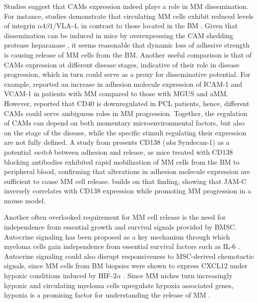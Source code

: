 Studies suggest that \acp{CAM} expression indeed plays a role in \ac{MM}
dissemination. For instance, studies demonstrate that circulating \ac{MM} cells
exhibit reduced levels of integrin $\alpha4\beta1$/VLA-4, in contrast to those located
in the \ac{BM} \cite{paivaDetailedCharacterizationMultiple2013,
    paivaCompetitionClonalPlasma2011}. Given that dissemination can be induced in
mice by overexpressing the \ac{CAM} shedding protease heparanase
\cite{yangHeparanasePromotesSpontaneous2005}, it seems reasonable that dynamic
loss of adhesive strength is causing release of \ac{MM} cells from the \ac{BM}.
Another useful comparison is that of \acp{CAM} expression at different disease
stages, indicative of their role in disease progression, which in turn could
serve as a proxy for disseminative potential. For example,
\citet{terposIncreasedCirculatingVCAM12016}
reported an increase in adhesion molecule expression of ICAM-1 and VCAM-1 in
patients with \ac{MM} compared to those with \ac{MGUS} and \ac{aMM}. However,
\citet{perez-andresClonalPlasmaCells2005} reported that CD40 is downregulated in
\ac{PCL} patients, hence, different \acp{CAM} could serve ambiguous roles in
\ac{MM} progression. Together, the regulation of \acp{CAM} can depend on both
momentary microenvironmental factors, but also on the stage of the disease,
while the specific stimuli regulating their expression are not fully defined. A
study from \citet{akhmetzyanovaDynamicCD138Surface2020} presents CD138
(\textit{aka} Syndecan-1) as a potential \textit{switch} between adhesion and
release, as mice treated with CD138 blocking antibodies exhibited
rapid mobilization of \ac{MM} cells from the \ac{BM} to peripheral blood,
confirming that alterations in adhesion molecule expression are sufficient to
cause \ac{MM} cell release. \citet{brandlJunctionalAdhesionMolecule2022}
builds on that finding, showing that JAM-C inversely correlates with CD138
expression while promoting \ac{MM} progression in a mouse model.


Another often overlooked requirement for \ac{MM} cell release is the need for
independence from essential growth and survival signals provided by \ac{BMSC}.
Autocrine signaling has been proposed as a key mechanism through which myeloma
cells gain independence from essential survival factors such as IL-6
\cite{frassanitoAutocrineInterleukin6Production2001,
    urashimaCD40LigandTriggered1995}. Autocrine signaling could also disrupt
responsiveness to \ac{MSC}-derived chemotactic signals, since \ac{MM} cells from
\ac{BM} biopsies were shown to express CXCL12 under hypoxic conditions induced
by HIF-2$\alpha$ \cite{martinHypoxiainducibleFactor2Novel2010}. Since \ac{MM}
niches turn increasingly hypoxic and circulating myeloma cells upregulate
hypoxia associated genes, hypoxia is a promising factor for understanding the
release of \ac{MM} \cite{garcesTranscriptionalProfilingCirculating2020}.



